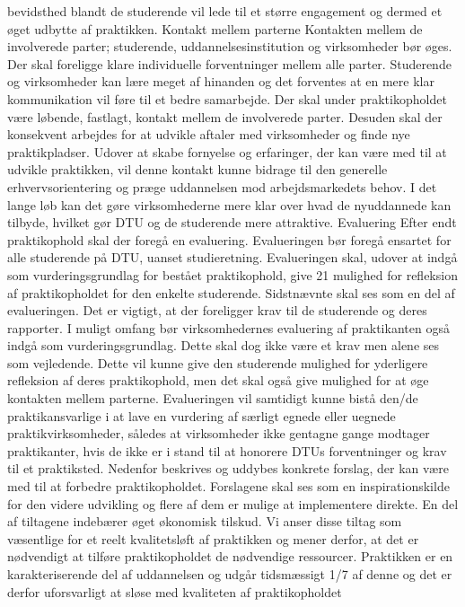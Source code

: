 bevidsthed blandt de studerende vil lede til et større engagement og dermed et øget udbytte af praktikken.
Kontakt mellem parterne
Kontakten mellem de involverede parter; studerende, uddannelsesinstitution og virksomheder bør øges. Der skal
foreligge klare individuelle forventninger mellem alle parter. Studerende og virksomheder kan lære meget af hinanden
og det forventes at en mere klar kommunikation vil føre til et bedre samarbejde. Der skal under praktikopholdet være
løbende, fastlagt, kontakt mellem de involverede parter. Desuden skal der konsekvent arbejdes for at udvikle aftaler
med virksomheder og finde nye praktikpladser. Udover at skabe fornyelse og erfaringer, der kan være med til at udvikle
praktikken, vil denne kontakt kunne bidrage til den generelle erhvervsorientering og præge uddannelsen mod
arbejdsmarkedets behov. I det lange løb kan det gøre virksomhederne mere klar over hvad de nyuddannede kan tilbyde,
hvilket gør DTU og de studerende mere attraktive.
Evaluering
Efter endt praktikophold skal der foregå en evaluering. Evalueringen bør foregå ensartet for alle studerende på DTU,
uanset studieretning. Evalueringen skal, udover at indgå som vurderingsgrundlag for bestået praktikophold, give
21
mulighed for refleksion af praktikopholdet for den enkelte studerende. Sidstnævnte skal ses som en del af evalueringen.
Det er vigtigt, at der foreligger krav til de studerende og deres rapporter.
I muligt omfang bør virksomhedernes evaluering af praktikanten også indgå som vurderingsgrundlag. Dette skal dog
ikke være et krav men alene ses som vejledende. Dette vil kunne give den studerende mulighed for yderligere refleksion
af deres praktikophold, men det skal også give mulighed for at øge kontakten mellem parterne.
Evalueringen vil samtidigt kunne bistå den/de praktikansvarlige i at lave en vurdering af særligt egnede eller uegnede
praktikvirksomheder, således at virksomheder ikke gentagne gange modtager praktikanter, hvis de ikke er i stand til at
honorere DTUs forventninger og krav til et praktiksted.
Nedenfor beskrives og uddybes konkrete forslag, der kan være med til at forbedre praktikopholdet. Forslagene skal ses
som en inspirationskilde for den videre udvikling og flere af dem er mulige at implementere direkte. En del af tiltagene
indebærer øget økonomisk tilskud. Vi anser disse tiltag som væsentlige for et reelt kvalitetsløft af praktikken og mener
derfor, at det er nødvendigt at tilføre praktikopholdet de nødvendige ressourcer. Praktikken er en karakteriserende del af
uddannelsen og udgår tidsmæssigt 1/7 af denne og det er derfor uforsvarligt at sløse med kvaliteten af praktikopholdet
